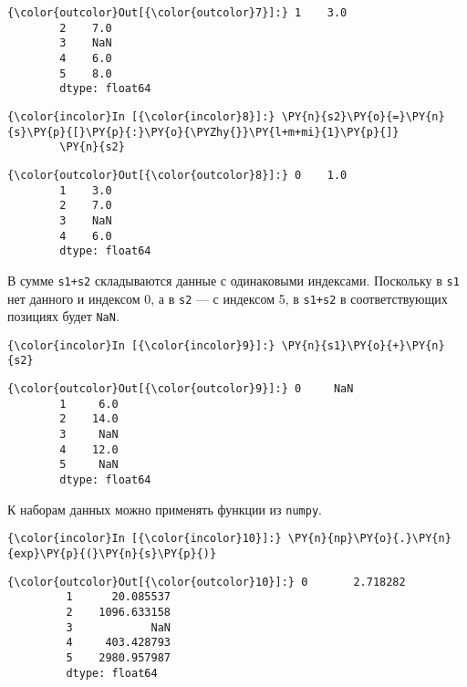             \begin{Verbatim}[commandchars=\\\{\}]
{\color{outcolor}Out[{\color{outcolor}7}]:} 1    3.0
        2    7.0
        3    NaN
        4    6.0
        5    8.0
        dtype: float64
\end{Verbatim}
        
    \begin{Verbatim}[commandchars=\\\{\}]
{\color{incolor}In [{\color{incolor}8}]:} \PY{n}{s2}\PY{o}{=}\PY{n}{s}\PY{p}{[}\PY{p}{:}\PY{o}{\PYZhy{}}\PY{l+m+mi}{1}\PY{p}{]}
        \PY{n}{s2}
\end{Verbatim}

            \begin{Verbatim}[commandchars=\\\{\}]
{\color{outcolor}Out[{\color{outcolor}8}]:} 0    1.0
        1    3.0
        2    7.0
        3    NaN
        4    6.0
        dtype: float64
\end{Verbatim}
        
    В сумме \texttt{s1+s2} складываются данные с одинаковыми индексами.
Поскольку в \texttt{s1} нет данного и индексом 0, а в \texttt{s2} --- с
индексом 5, в \texttt{s1+s2} в соответствующих позициях будет
\texttt{NaN}.

    \begin{Verbatim}[commandchars=\\\{\}]
{\color{incolor}In [{\color{incolor}9}]:} \PY{n}{s1}\PY{o}{+}\PY{n}{s2}
\end{Verbatim}

            \begin{Verbatim}[commandchars=\\\{\}]
{\color{outcolor}Out[{\color{outcolor}9}]:} 0     NaN
        1     6.0
        2    14.0
        3     NaN
        4    12.0
        5     NaN
        dtype: float64
\end{Verbatim}
        
    К наборам данных можно применять функции из \texttt{numpy}.

    \begin{Verbatim}[commandchars=\\\{\}]
{\color{incolor}In [{\color{incolor}10}]:} \PY{n}{np}\PY{o}{.}\PY{n}{exp}\PY{p}{(}\PY{n}{s}\PY{p}{)}
\end{Verbatim}

            \begin{Verbatim}[commandchars=\\\{\}]
{\color{outcolor}Out[{\color{outcolor}10}]:} 0       2.718282
         1      20.085537
         2    1096.633158
         3            NaN
         4     403.428793
         5    2980.957987
         dtype: float64
\end{Verbatim}
        
